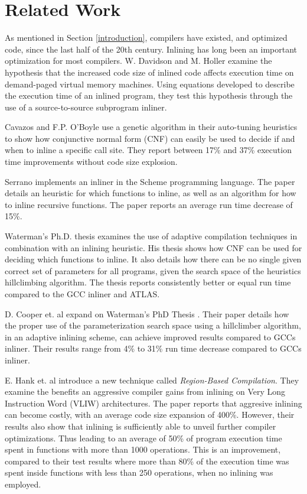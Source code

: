 
\clearpage
\section{Related Work}

As mentioned in Section \ref{introduction}, compilers have existed, and
optimized code, since the last half of the 20th century. Inlining has long been
an important optimization for most compilers. W. Davidson and M. Holler
\cite{SubprogInlining} examine the hypothesis that the increased code size of
inlined code affects execution time on demand-paged virtual memory machines.
Using equations developed to describe the execution time of an inlined program,
they test this hypothesis through the use of a source-to-source subprogram
inliner.

Cavazos and F.P. O'Boyle \cite{AutoTuningJavaHeuristics} use a genetic algorithm
in their auto-tuning heuristics to show how conjunctive normal form (CNF) can
easily be used to decide if and when to inline a specific call site. They report
between 17\% and 37\% execution time improvements without code size explosion.

Serrano \cite{InlineWhenHowSerrano} implements an inliner in the Scheme
programming language. The paper details an heuristic for which functions to
inline, as well as an algorithm for how to inline recursive functions. The paper
reports an average run time decrease of 15\%.

Waterman's Ph.D. thesis \cite{AdaptvCompilAndInlingWaterman} examines the use of
adaptive compilation techniques in combination with an inlining heuristic. His
thesis shows how CNF can be used for deciding which functions to inline. It also
details how there can be no single given correct set of parameters for all
programs, given the search space of the heuristics hillclimbing algorithm. The
thesis reports consistently better or equal run time compared to the GCC inliner
and ATLAS.

D. Cooper et. al \cite{AdaptvStratInlSubst} expand on Waterman's PhD Thesis
\cite{AdaptvCompilAndInlingWaterman}. Their paper details how the proper use of
the parameterization search space using a hillclimber algorithm, in an adaptive
inlining scheme, can achieve improved results compared to GCCs inliner. Their
results range from 4\% to 31\% run time decrease compared to GCCs inliner.

E. Hank et. al \cite{RegionBasedCompilationIntroduction} introduce a new
technique called \textit{Region-Based Compilation}. They examine the benefits an
aggressive compiler gains from inlining on Very Long Instruction Word (VLIW)
architectures. The paper reports that aggresive inlining can become costly, with
an average code size expansion of 400\%. However, their results also show that
inlining is sufficiently able to unveil further compiler optimizations. Thus
leading to an average of 50\% of program execution time spent in functions with
more than 1000 operations. This is an improvement, compared to their test
results where more than 80\% of the execution time was spent inside functions
with less than 250 operations, when no inlining was employed.

